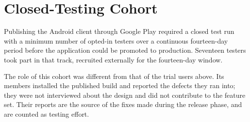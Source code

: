 \section{Closed-Testing Cohort}

Publishing the Android client through Google Play required a closed test run
with a minimum number of opted-in testers over a continuous fourteen-day
period before the application could be promoted to production. Seventeen
testers took part in that track, recruited externally for the fourteen-day
window.

The role of this cohort was different from that of the trial users above.
Its members installed the published build and reported the defects they ran
into; they were not interviewed about the design and did not contribute to the
feature set. Their reports are the source of the fixes made during the release
phase, and are counted as testing effort.
